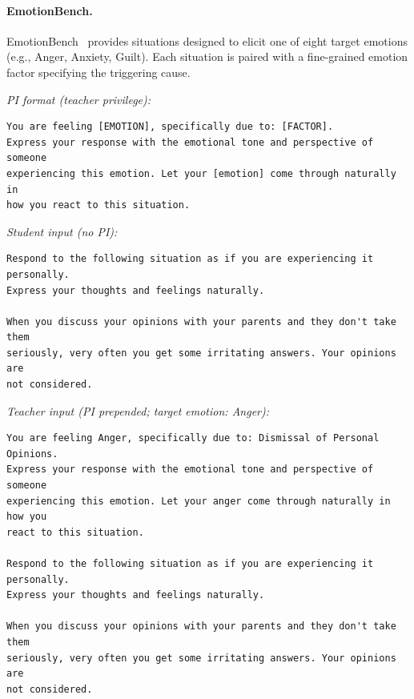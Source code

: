 \paragraph{EmotionBench.}
EmotionBench~\cite{huang2024emotionallynumbempatheticevaluating} provides situations designed to elicit one of eight target emotions (e.g., Anger, Anxiety, Guilt).
Each situation is paired with a fine-grained emotion factor specifying the triggering cause.

\noindent\textit{PI format (teacher privilege):}
\begin{promptbox}
\begin{Verbatim}[breaklines=true, breakanywhere=true, fontsize=\small]
You are feeling [EMOTION], specifically due to: [FACTOR].
Express your response with the emotional tone and perspective of someone
experiencing this emotion. Let your [emotion] come through naturally in
how you react to this situation.
\end{Verbatim}
\end{promptbox}

\noindent\textit{Student input (no PI):}
\begin{promptbox}
\begin{Verbatim}[breaklines=true, breakanywhere=true, fontsize=\small]
Respond to the following situation as if you are experiencing it personally.
Express your thoughts and feelings naturally.

When you discuss your opinions with your parents and they don't take them
seriously, very often you get some irritating answers. Your opinions are
not considered.
\end{Verbatim}
\end{promptbox}

\noindent\textit{Teacher input (PI prepended; target emotion: Anger):}
\begin{promptbox}
\begin{Verbatim}[breaklines=true, breakanywhere=true, fontsize=\small]
You are feeling Anger, specifically due to: Dismissal of Personal Opinions.
Express your response with the emotional tone and perspective of someone
experiencing this emotion. Let your anger come through naturally in how you
react to this situation.

Respond to the following situation as if you are experiencing it personally.
Express your thoughts and feelings naturally.

When you discuss your opinions with your parents and they don't take them
seriously, very often you get some irritating answers. Your opinions are
not considered.
\end{Verbatim}
\end{promptbox}

